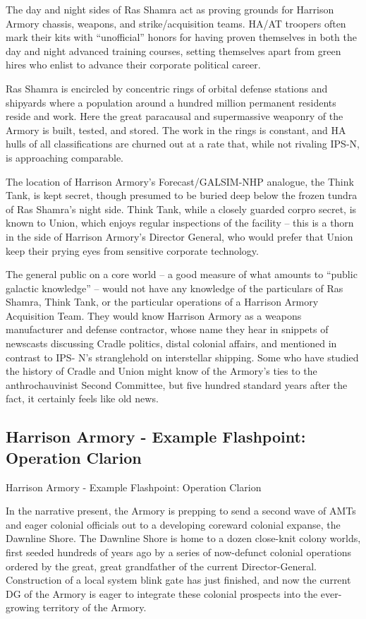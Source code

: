 The day and night sides of Ras Shamra act as proving grounds for Harrison Armory chassis,
weapons, and strike/acquisition teams. HA/AT troopers often mark their kits with “unofficial”
honors for having proven themselves in both the day and night advanced training courses,
setting themselves apart from green hires who enlist to advance their corporate political career.


Ras Shamra is encircled by concentric rings of orbital defense stations and shipyards where a
population around a hundred million permanent residents reside and work. Here the great
paracausal and supermassive weaponry of the Armory is built, tested, and stored. The work in
the rings is constant, and HA hulls of all classifications are churned out at a rate that, while not
rivaling IPS-N, is approaching comparable.


The location of Harrison Armory’s Forecast/GALSIM-NHP analogue, the Think Tank, is kept
secret, though presumed to be buried deep below the frozen tundra of Ras Shamra’s night side.
Think Tank, while a closely guarded corpro secret, is known to Union, which enjoys regular
inspections of the facility -- this is a thorn in the side of Harrison Armory’s Director General, who
would prefer that Union keep their prying eyes from sensitive corporate technology.


The general public on a core world -- a good measure of what amounts to “public galactic
knowledge” -- would not have any knowledge of the particulars of Ras Shamra, Think Tank, or
the particular operations of a Harrison Armory Acquisition Team. They would know Harrison
Armory as a weapons manufacturer and defense contractor, whose name they hear in snippets
of newscasts discussing Cradle politics, distal colonial affairs, and mentioned in contrast to IPS-
N’s stranglehold on interstellar shipping. Some who have studied the history of Cradle and Union
might know of the Armory’s ties to the anthrochauvinist Second Committee, but five hundred
standard years after the fact, it certainly feels like old news.

\subsection{Harrison Armory - Example Flashpoint: Operation Clarion  }
Harrison Armory - Example Flashpoint: Operation Clarion

In the narrative present, the Armory is prepping to send a second wave of AMTs and eager
colonial officials out to a developing coreward colonial expanse, the Dawnline Shore. The
Dawnline Shore is home to a dozen close-knit colony worlds, first seeded hundreds of years ago
by a series of now-defunct colonial operations ordered by the great, great grandfather of the
current Director-General. Construction of a local system blink gate has just finished, and now the
current DG of the Armory is eager to integrate these colonial prospects into the ever-growing
territory of the Armory.





